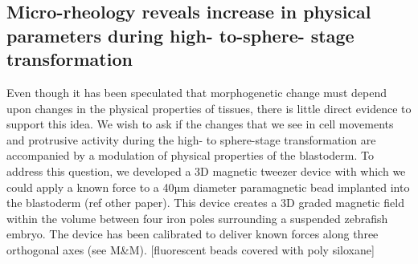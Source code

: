 \subsection{Micro-rheology reveals increase in physical parameters during high- to-sphere- stage transformation}
Even though it has been speculated that morphogenetic change must depend upon changes in the physical properties of tissues, there is little direct evidence to support this idea.
We wish to ask if the changes that we see in cell movements and protrusive activity during the high- to sphere-stage transformation are accompanied by a modulation of physical properties of the blastoderm.
To address this question, we developed a 3D magnetic tweezer device with which we could apply a known force to a 40µm diameter paramagnetic bead implanted into the blastoderm (ref other paper).
This device creates a 3D graded magnetic field within the volume between four iron poles surrounding a suspended zebrafish embryo.
The device has been calibrated to deliver known forces along three orthogonal axes (see M\&M).
[fluorescent beads covered with poly siloxane]

